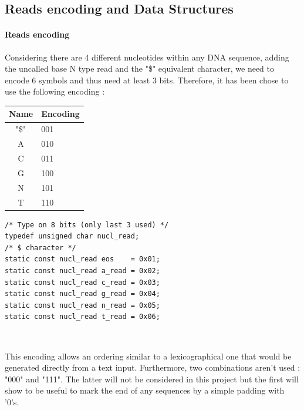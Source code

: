 \subsection{Reads encoding and Data Structures}

\paragraph{Reads encoding}

Considering there are 4 different nucleotides within any DNA sequence, adding the uncalled base N type read and the "\$" equivalent character, we need to encode 6 symbols and thus need at least 3 bits. Therefore, it has been chose to use the following encoding : \\

\begin{minipage}[c]{0.35\textwidth}
\vspace*{6mm}
	\begin{tabular}{|c|l|}
	\hline
		Name & Encoding \\
		\hline 
		"\$" & 001 \\
		A & 010 \\
		C & 011 \\
		G & 100 \\
		N & 101 \\
		T & 110 \\
    \hline
	\end{tabular}
\end{minipage}
\begin{minipage}[t]{0.85\textwidth}
\vspace*{-30mm}
    \begin{verbatim}
/* Type on 8 bits (only last 3 used) */
typedef unsigned char nucl_read; 
/* $ character */
static const nucl_read eos    = 0x01;	
static const nucl_read a_read = 0x02;
static const nucl_read c_read = 0x03;
static const nucl_read g_read = 0x04;
static const nucl_read n_read = 0x05;
static const nucl_read t_read = 0x06;
    \end{verbatim}
\begin{lstlisting}


\end{lstlisting}
\end{minipage}
\vspace*{3mm}

This encoding allows an ordering similar to a lexicographical one that would be generated directly from a text input. Furthermore, two combinations aren't used : \textrm{"000"} and \textrm{"111"}. The latter will not be considered in this project but the first will show to be useful to mark the end of any sequences by a simple padding with \textrm{'0's}.


